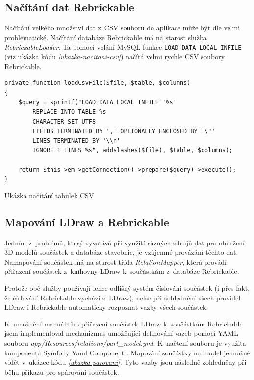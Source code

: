 \subsection{Načítání dat Rebrickable}\label{nacitani-rebrickable}
Načítání velkého množství dat z~CSV souborů do aplikace může být dle \autocite{grok} velmi problematické. Načítání databáze Rebrickable má na starost služba \textit{RebrickableLoader}. Ta pomocí volání MySQL funkce \texttt{LOAD DATA LOCAL INFILE} (viz ukázka kódu \emph{\ref{ukazka-nacitani-csv}}) načítá velmi rychle CSV soubory Rebrickable.

\begin{listing}[htbp]
        \begin{verbatim}
private function loadCsvFile($file, $table, $columns)
{
    $query = sprintf("LOAD DATA LOCAL INFILE '%s' 
        REPLACE INTO TABLE %s
        CHARACTER SET UTF8
        FIELDS TERMINATED BY ',' OPTIONALLY ENCLOSED BY '\"'
        LINES TERMINATED BY '\\n'
        IGNORE 1 LINES %s", addslashes($file), $table, $columns);

    return $this->em->getConnection()->prepare($query)->execute();
}
        \end{verbatim}
    \caption{Ukázka načítání tabulek CSV \label{ukazka-nacitani-csv}}
\end{listing}

\subsection{Mapování LDraw a Rebrickable}
Jedním z~problémů, který vyvstává při využití různých zdrojů dat pro obdržení 3D modelů součástek a databáze stavebnic, je vzájemné provázání těchto dat. Namapování součástek má na starost třída \textit{RelationMapper}, která provádí přiřazení součástek z~knihovny LDraw k~součástkám z~databáze Rebrickable. 

Protože obě služby používají lehce odlišný systém číslování součástek (i přes fakt, že číslování Rebrickable vychází z~LDraw), nelze při zohlednění všech pravidel LDraw \autocite{ldraw:numbering:faq} i Rebrickable \autocite{rebrickable:numbering:changes} automaticky rozpoznat vazby všech součástek.

K~umožnění manuálního přiřazení součástek LDraw k~součástkám Rebrickable jsem implementoval mechanizmus umožňující definování vazeb pomocí \gls{YAML} souboru \textit{app/Resources/relations/part\_model.yml}. K~načtení souboru je využita komponenta Symfony Yaml Component \autocite{symfony:yaml}. Mapování součástky na model je možné vidět v~ukázce kódu \emph{\ref{ukazka-parovani}}. Tyto vazby jsou následně zohledněny při běhu příkazu pro spárování součástek.

